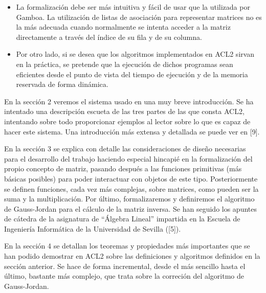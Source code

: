 \documentclass[a4paper,10pt]{article}
\begin{document}
\par\vspace{10pt}

\begin{itemize}
	\item La formalización debe ser más intuitiva y fácil de usar que la utilizada por Gamboa. La utilización de listas de asociación para representar matrices no es la más adecuada cuando normalmente se intenta acceder a la matriz directamente a través del índice de su fila y de su columna.
	\item Por otro lado, si se desea que los algoritmos implementados en ACL2 sirvan en la práctica, se pretende que la ejecución de dichos programas sean eficientes desde el punto de vista del tiempo de ejecución y de la memoria reservada de forma dinámica.
\end{itemize}

\par\vspace{10pt}

En la sección 2 veremos el sistema usado en una muy breve introducción. Se ha intentado una descripción escueta de las tres partes de las que consta ACL2, intentando sobre todo proporcionar ejemplos al lector sobre lo que es capaz de hacer este sistema. Una introducción más extensa y detallada se puede ver en [9].

\par\vspace{10pt}

En la sección 3 se explica con detalle las consideraciones de diseño necesarias para el desarrollo del trabajo haciendo especial hincapié en la formalización del propio concepto de matriz, pasando después a las funciones primitivas (más básicas posibles) para poder interactuar con objetos de este tipo. Posteriormente se definen funciones, cada vez más complejas, sobre matrices, como pueden ser la suma y la multiplicación. Por último, formalizaremos y definiremos el algoritmo de Gauss-Jordan para el cálculo de la matriz inversa. Se han seguido los apuntes de cátedra de la asignatura de ``Álgebra Lineal'' impartida en la Escuela de Ingeniería Informática de la Universidad de Sevilla ([5]). 

\par\vspace{10pt}

En la sección 4 se detallan los teoremas y propiedades más importantes que se han podido demostrar en ACL2 sobre las definiciones y algoritmos definidos en la sección anterior. Se hace de forma incremental, desde el más sencillo hasta el último, bastante más complejo, que trata sobre la correción del algoritmo de Gauss-Jordan.
\end{document}
